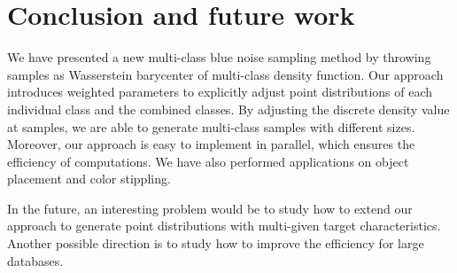 \section{Conclusion and future work}
We have presented a new multi-class blue noise sampling method by
throwing samples as  Wasserstein barycenter of multi-class density function.
Our approach introduces weighted parameters to explicitly adjust point distributions of each individual class and the combined classes.
By adjusting the discrete density value at samples,
we are able to generate multi-class samples with different sizes.
Moreover, our approach is easy to implement in parallel, which ensures the efficiency of computations.
We have also performed applications on object placement and color stippling.

In the future,
an interesting problem would be to study how to extend our approach to generate point distributions with multi-given target characteristics.
Another possible direction is to study how to improve the efficiency for large databases.

